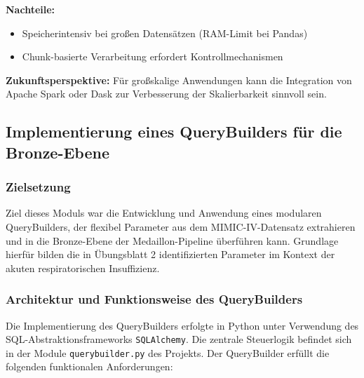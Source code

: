 \documentclass[12pt]{article}
\begin{document}
\textbf{Nachteile:}
\begin{itemize}
    \item Speicherintensiv bei großen Datensätzen (RAM-Limit bei Pandas)
    \item Chunk-basierte Verarbeitung erfordert Kontrollmechanismen
\end{itemize}

\textbf{Zukunftsperspektive:} Für großskalige Anwendungen kann die Integration von Apache Spark oder Dask zur Verbesserung der Skalierbarkeit sinnvoll sein.

\subsection{Implementierung eines QueryBuilders für die Bronze-Ebene}

\subsubsection{Zielsetzung}

Ziel dieses Moduls war die Entwicklung und Anwendung eines modularen QueryBuilders, der flexibel Parameter aus dem MIMIC-IV-Datensatz extrahieren und in die Bronze-Ebene der Medaillon-Pipeline überführen kann. Grundlage hierfür bilden die in Übungsblatt 2 identifizierten Parameter im Kontext der akuten respiratorischen Insuffizienz.

\subsubsection{Architektur und Funktionsweise des QueryBuilders}

Die Implementierung des QueryBuilders erfolgte in Python unter Verwendung des SQL-Abstraktionsframeworks \texttt{SQLAlchemy}. Die zentrale Steuerlogik befindet sich in der Module \texttt{querybuilder.py} des Projekts. Der QueryBuilder erfüllt die folgenden funktionalen Anforderungen:
\end{document}

